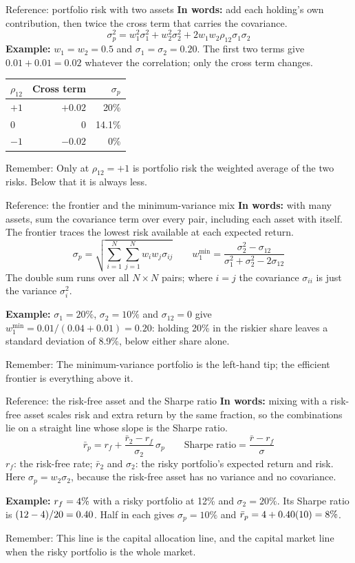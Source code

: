 \documentclass[10pt,aspectratio=169]{beamer}
\newcommand{\remember}[1]{\par\smallskip\alert{Remember:} #1}
\begin{document}
\begin{frame}[label=portrisk]{Reference: portfolio risk with two assets}
\textbf{In words:} add each holding's own contribution, then twice the cross term that carries the covariance.
\[
\sigma_p^2=w_1^2\sigma_1^2+w_2^2\sigma_2^2+2w_1w_2\rho_{12}\sigma_1\sigma_2
\]
\textbf{Example:} $w_1=w_2=0.5$ and $\sigma_1=\sigma_2=0.20$. The first two terms give $0.01+0.01=0.02$ whatever the correlation; only the cross term changes.
\par\smallskip\begingroup\centering
\begin{tabular}{lrr}
\toprule $\rho_{12}$ & Cross term & $\sigma_p$\\\midrule
$+1$ & $+0.02$ & 20\%\\
$0$ & $0$ & 14.1\%\\
$-1$ & $-0.02$ & 0\%\\\bottomrule
\end{tabular}
\par\endgroup\smallskip
\remember{Only at $\rho_{12}=+1$ is portfolio risk the weighted average of the two risks. Below that it is always less.}
\end{frame}

\begin{frame}[label=frontier]{Reference: the frontier and the minimum-variance mix}
\textbf{In words:} with many assets, sum the covariance term over every pair, including each asset with itself. The frontier traces the lowest risk available at each expected return.
\[
\sigma_p=\sqrt{\sum_{i=1}^{N}\sum_{j=1}^{N}w_iw_j\sigma_{ij}}\qquad
w_1^{\min}=\frac{\sigma_2^2-\sigma_{12}}{\sigma_1^2+\sigma_2^2-2\sigma_{12}}
\]
The double sum runs over all $N\times N$ pairs; where $i=j$ the covariance $\sigma_{ii}$ is just the variance $\sigma_i^2$.
\par\smallskip
\textbf{Example:} $\sigma_1=20\%$, $\sigma_2=10\%$ and $\sigma_{12}=0$ give $w_1^{\min}=0.01/(0.04+0.01)=0.20$: holding 20\% in the riskier share leaves a standard deviation of 8.9\%, below either share alone.
\remember{The minimum-variance portfolio is the left-hand tip; the efficient frontier is everything above it.}
\end{frame}

\begin{frame}[label=cal]{Reference: the risk-free asset and the Sharpe ratio}
\textbf{In words:} mixing with a risk-free asset scales risk and extra return by the same fraction, so the combinations lie on a straight line whose slope is the Sharpe ratio.
\[
\bar{r}_p=r_f+\frac{\bar{r}_2-r_f}{\sigma_2}\,\sigma_p\qquad
\text{Sharpe ratio}=\frac{\bar{r}-r_f}{\sigma}
\]
$r_f$: the risk-free rate; $\bar{r}_2$ and $\sigma_2$: the risky portfolio's expected return and risk. Here $\sigma_p=w_2\sigma_2$, because the risk-free asset has no variance and no covariance.
\par\smallskip
\textbf{Example:} $r_f=4\%$ with a risky portfolio at 12\% and $\sigma_2=20\%$. Its Sharpe ratio is $(12-4)/20=0.40$. Half in each gives $\sigma_p=10\%$ and $\bar{r}_p=4+0.40(10)=8\%$.
\remember{This line is the capital allocation line, and the capital market line when the risky portfolio is the whole market.}
\end{frame}
\end{document}
